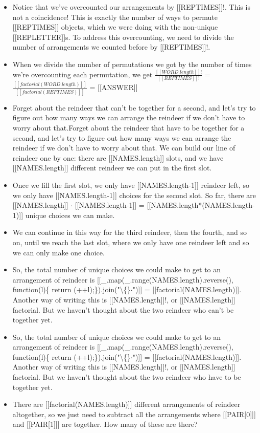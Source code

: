 \documentclass{article}
\begin{document}
\begin{itemize}
                                [[PERM]]
  \item Notice that we've overcounted our arrangements by [[REPTIMES]]!. This is not a coincidence!
                        This is exactly the number of ways to permute [[REPTIMES]] objects, which we were doing with the
                        non-unique [[REPLETTER]]s. To address this overcounting, we need to divide the number of arrangements we counted
                        before by [[REPTIMES]]!.
  \item When we divide the number of permutations we got by the number of times we're overcounting each permutation, we get
                         $\frac{[[WORD.length]]!}{[[REPTIMES]]!}$ = $\frac{[[factorial(WORD.length)]]}{[[factorial(REPTIMES)]]}$ = [[ANSWER]]
  \item Forget about the reindeer that can't be together for a second, and let's try to
                        figure out how many ways we can arrange the reindeer if we don't have to worry about that.Forget about the reindeer that have to be together for a second, and let's try to
                        figure out how many ways we can arrange the reindeer if we don't have to worry about that.
                        We can build our line of reindeer one by one: there are [[NAMES.length]] slots,
                        and we have [[NAMES.length]] different reindeer we can put in the first slot.
  \item Once we fill the first slot, we only have [[NAMES.length-1]] reindeer left, so we only have
                        [[NAMES.length-1]]
                        choices for the second slot. So far, there are [[NAMES.length]] $\cdot$ [[NAMES.length-1]] = [[NAMES.length*(NAMES.length-1)]] unique choices we can make.
  \item We can continue in this way for the third reindeer, then the fourth, and so on, until we reach the last slot, where we only have
                        one reindeer left and so we can only make one choice.
  \item So, the total number of unique choices we could make to get to an arrangement of reindeer is [[\_.map(\_.range(NAMES.length).reverse(), function(l)\{ return (++l);\}).join("\textbackslash\{\}$\cdot$")]] = [[factorial(NAMES.length)]]. Another way of writing this is [[NAMES.length]]!,
                        or [[NAMES.length]] factorial. But we haven't thought about the two reindeer who can't be together yet.
  \item So, the total number of unique choices we could make to get to an arrangement of reindeer is [[\_.map(\_.range(NAMES.length).reverse(), function(l)\{ return (++l);\}).join("\textbackslash\{\}$\cdot$")]] = [[factorial(NAMES.length)]]. Another way of writing this is [[NAMES.length]]!,
                        or [[NAMES.length]] factorial. But we haven't thought about the two reindeer who have to be together yet.
  \item There are [[factorial(NAMES.length)]] different arrangements of reindeer altogether,
                            so we just need to subtract
                            all the arrangements where [[PAIR[0]]] and [[PAIR[1]]] are together. How many of these are there?
                        

\end{itemize}
\end{document}
